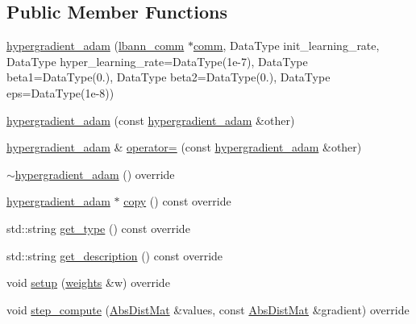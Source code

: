 \subsection*{Public Member Functions}
\begin{DoxyCompactItemize}
\item 
\hyperlink{classlbann_1_1hypergradient__adam_aefb4d2c307d8f7997624b2ebe977ca3b}{hypergradient\+\_\+adam} (\hyperlink{classlbann_1_1lbann__comm}{lbann\+\_\+comm} $\ast$\hyperlink{file__io_8cpp_ab048c6f9fcbcfaa57ce68b00263dbebe}{comm}, Data\+Type init\+\_\+learning\+\_\+rate, Data\+Type hyper\+\_\+learning\+\_\+rate=Data\+Type(1e-\/7), Data\+Type beta1=\+Data\+Type(0.), Data\+Type beta2=\+Data\+Type(0.), Data\+Type eps=\+Data\+Type(1e-\/8))
\item 
\hyperlink{classlbann_1_1hypergradient__adam_aadb9841237fca01bbe2187a39e8f3cc5}{hypergradient\+\_\+adam} (const \hyperlink{classlbann_1_1hypergradient__adam}{hypergradient\+\_\+adam} \&other)
\item 
\hyperlink{classlbann_1_1hypergradient__adam}{hypergradient\+\_\+adam} \& \hyperlink{classlbann_1_1hypergradient__adam_aab8df6bbd256c9731dc1e5b8eac286ec}{operator=} (const \hyperlink{classlbann_1_1hypergradient__adam}{hypergradient\+\_\+adam} \&other)
\item 
\hyperlink{classlbann_1_1hypergradient__adam_af77f1872a0598de038064759a3d53fa0}{$\sim$hypergradient\+\_\+adam} () override
\item 
\hyperlink{classlbann_1_1hypergradient__adam}{hypergradient\+\_\+adam} $\ast$ \hyperlink{classlbann_1_1hypergradient__adam_a09a7e0bbae7d18cc94a2f5ad098f1f38}{copy} () const override
\item 
std\+::string \hyperlink{classlbann_1_1hypergradient__adam_a21ba2e54a7c803c10ab8354d0552ba82}{get\+\_\+type} () const override
\item 
std\+::string \hyperlink{classlbann_1_1hypergradient__adam_aadcd02daeca55493b0e7210195ddb6ec}{get\+\_\+description} () const override
\item 
void \hyperlink{classlbann_1_1hypergradient__adam_acbc4aa4410eb2e7cb2fd9f423c4909dc}{setup} (\hyperlink{classlbann_1_1weights}{weights} \&w) override
\item 
void \hyperlink{classlbann_1_1hypergradient__adam_af9168cfd95707f361f0412ff2440761f}{step\+\_\+compute} (\hyperlink{base_8hpp_a9a697a504ae84010e7439ffec862b470}{Abs\+Dist\+Mat} \&values, const \hyperlink{base_8hpp_a9a697a504ae84010e7439ffec862b470}{Abs\+Dist\+Mat} \&gradient) override
\end{DoxyCompactItemize}

